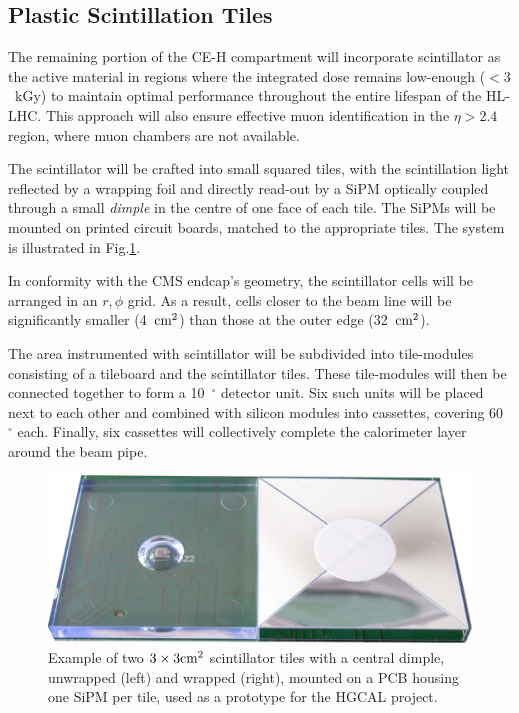 \subsection{Plastic Scintillation Tiles}
\label{sec:Plastic Scintillation Tiles}

The remaining portion of the CE-H compartment will incorporate scintillator as the active material in regions where the integrated dose remains low-enough ($<3$~kGy) to maintain optimal performance throughout the entire lifespan of the HL-LHC. 
This approach will also ensure effective muon identification in the $\eta>2.4$ region, where muon chambers are not available.

The scintillator will be crafted into small squared tiles, with the scintillation light reflected by a wrapping foil and directly read-out by a SiPM optically coupled through a small \textit{dimple} in the centre of one face of each tile. The SiPMs will be mounted on printed circuit boards, matched to the appropriate tiles. 
The system is illustrated in Fig.\ref{fig:ScintillatorTiles}.

In conformity with the CMS endcap's geometry, the scintillator cells will be arranged in an $r,\phi$ grid. As a result, cells closer to the beam line will be significantly smaller (4~$\textnormal{cm}^2$) than those at the outer edge (32~$\textnormal{cm}^2$). 

The area instrumented with scintillator will be subdivided into tile-modules consisting of a tileboard and the scintillator tiles. These tile-modules will then be connected together to form a 10~$^{\circ}$ detector unit. Six such units will be placed next to each other and combined with silicon modules into cassettes, covering 60~$^{\circ}$ each. Finally, six cassettes will collectively complete the calorimeter layer around the beam pipe.

\begin{figure}
    \centering
    \includegraphics[width=0.5\linewidth]{Figures/HGCAL/ScintillatorTiles.pdf}
    \caption{Example of two $3\times3\textnormal{cm}^2$ scintillator tiles with a central dimple, unwrapped (left) and wrapped (right), mounted on a PCB housing one SiPM per tile, used as a prototype for the HGCAL project.}
    \label{fig:ScintillatorTiles}
\end{figure}

